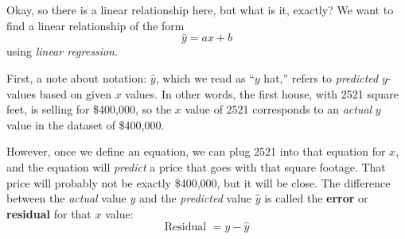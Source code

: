 Okay, so there is a linear relationship here, but what is it, exactly?  We want to find a linear relationship of the form
\[\hat{y} = ax + b\]
using \emph{linear regression}.

First, a note about notation: $\hat{y}$, which we read as ``$y$ hat,'' refers to \emph{predicted} $y$-values based on given $x$ values.  In other words, the first house, with 2521 square feet, is selling for \$400,000, so the $x$ value of 2521 corresponds to an \emph{actual} $y$ value in the dataset of \$400,000.

However, once we define an equation, we can plug 2521 into that equation for $x$, and the equation will \emph{predict} a price that goes with that square footage.  That price will probably not be exactly \$400,000, but it will be close.  The difference between the \emph{actual} value $y$ and the \emph{predicted} value $\hat{y}$ is called the \textbf{error} or \textbf{residual} for that $x$ value:
\[\textrm{Residual } = y - \hat{y}\]
\pagebreak

